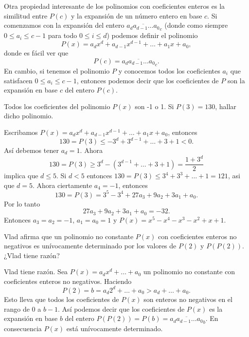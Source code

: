 Otra propiedad interesante de los polinomios con coeficientes enteros es la similitud entre $P(c)$ y la expansión de un número entero en base $c$.
Si comenzamos con la expansión del entero $\overline{a_d a_{d - 1} \ldots a_0}_c$ (donde como siempre $0 \leq a_i \leq c - 1$ para todo $0 \leq i \leq d$) podemos definir el polinomio
\[
    P(x) = a_d x^d + a_{d - 1} x^{d - 1} + \ldots + a_1 x + a_0,
\]
donde es fácil ver que
\[
    P(c) = \overline{a_d a_{d - 1} \ldots a_0}_c.
\]
En cambio, si tenemos el polinomio $P$ y conocemos todos los coeficientes $a_i$ que satisfacen $0 \leq a_i \leq c - 1$, entonces podemos decir que los coeficientes de $P$ son la expansión en base $c$ del entero $P(c)$.

\begin{example}
    Todos los coeficientes del polinomio $P(x)$ son -1 o 1.
    Si $P(3) = 130$, hallar dicho polinomio.
\end{example}
\begin{solution}
    Escribamos $P(x) = a_d x^d + a_{d - 1} x^{d - 1} + \ldots + a_1 x + a_0$, entonces
    \[
        130 = P(3) \leq - 3^d + 3^{d - 1} + \ldots + 3 + 1 < 0.
    \]
    Así debemos tener $a_d = 1$.
    Ahora
    \[
        130 = P(3) \geq 3^d - \left(3^{d - 1} + \ldots + 3 + 1\right) = \frac{1 + 3^d}{2}
    \]
    implica que $d \leq 5$.
    Si $d < 5$ entonces $130 = P(3) \leq 3^4 + 3^3 + \ldots + 1 = 121$, asi que $d = 5$.
    Ahora ciertamente $a_4 = -1$, entonces
    \[
        130 = P(3) = 3^5 - 3^4 + 27 a_3 + 9 a_2 + 3 a_1 + a_0.
    \]
    Por lo tanto
    \[
        27 a_3 + 9 a_2 + 3 a_1 + a_0 = -32.
    \]
    Entonces $a_3 = a_2 = -1$, $a_1 = a_0 = 1$ y $P(x) = x^5 - x^4 - x^3 - x^2 + x + 1$.
\end{solution}


\begin{example}
    Vlad afirma que un polinomio no constante $P(x)$ con coeficientes enteros no negativos es unívocamente determinado por los valores de $P(2)$ y $P(P(2))$.
    ¿Vlad tiene razón?
\end{example}
\begin{solution}
    Vlad tiene razón.
    Sea $P(x) = a_d x^d + \ldots + a_0$ un polinomio no constante con coeficientes enteros no negativos.
    Haciendo
    \[
        P(2) = b = a_d 2^d + \ldots + a_0 > a_d + \ldots + a_0.
    \]
    Esto lleva que todos los coeficientes de $P(x)$ son enteros no negativos en el rango de 0 a $b - 1$.
    Así podemos decir que los coeficientes de $P(x)$ es la expansión en base $b$ del entero $P(P(2)) = P(b) = \overline{a_d a_{d - 1} \ldots a_0}_b.$
    En consecuencia $P(x)$ está unívocamente determinado.
\end{solution}


